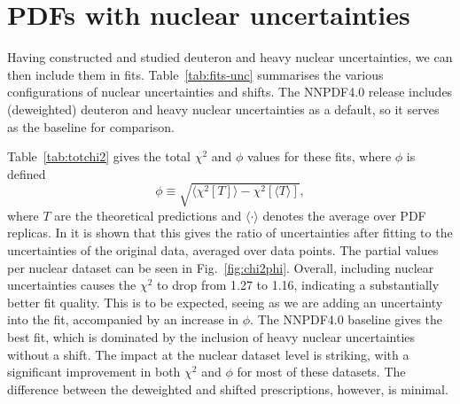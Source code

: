 \section{PDFs with nuclear uncertainties}
\label{sec:nucpdfs}
Having constructed and studied deuteron and heavy nuclear uncertainties, we can then include them in fits. Table~\ref{tab:fits-unc} summarises the various configurations of nuclear uncertainties and shifts. The NNPDF4.0 release includes (deweighted) deuteron and heavy nuclear uncertainties as a default, so it serves as the baseline for comparison.


Table~\ref{tab:totchi2} gives the total $\chi^2$ and $\phi$ values for these fits, where $\phi$ is defined
\begin{equation}
\phi \equiv \sqrt{\langle \chi^2[T] \rangle - \chi^2[\langle T \rangle ]},
\end{equation}
where $T$ are the theoretical predictions and $\langle \cdot \rangle$ denotes the average over PDF replicas. In \cite{Ball:2014uwa} it is shown that this gives the ratio of uncertainties after fitting to the uncertainties of the original data, averaged over data points. The partial values per nuclear dataset can be seen in Fig.~\ref{fig:chi2phi}. Overall, including nuclear uncertainties causes the $\chi^2$ to drop from 1.27 to 1.16, indicating a substantially better fit quality. This is to be expected, seeing as we are adding an uncertainty into the fit, accompanied by an increase in $\phi$. The NNPDF4.0 baseline gives the best fit, which is dominated by the inclusion of heavy nuclear uncertainties without a shift. The impact at the nuclear dataset level is striking, with a significant improvement in both $\chi^2$ and $\phi$ for most of these datasets. The difference between the deweighted and shifted prescriptions, however, is minimal.

